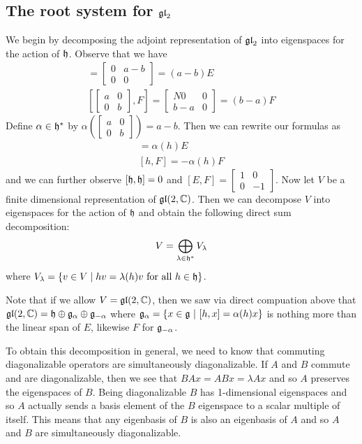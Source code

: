 \documentclass[12pt]{article}
\begin{document}
\subsection{The root system for $\mathfrak{gl}_2$}
We begin by decomposing the adjoint representation of $\mathfrak{gl}_2$ into eigenspaces for the action of $\mathfrak{h}$. Observe that we have \begin{align*}
    [\begin{bmatrix}
        a & 0 \\
        0 & b
    \end{bmatrix},E] = \begin{bmatrix}
        0 & a-b \\
        0 & 0
    \end{bmatrix} = (a-b)E \\
    [\begin{bmatrix}
        a & 0 \\
        0 & b
    \end{bmatrix},F] = \begin{bmatrix}N
        0 & 0 \\
        b-a & 0
    \end{bmatrix} = (b-a)F
\end{align*} Define $\alpha \in \mathfrak{h}^*$ by $\alpha(\begin{bmatrix}
    a & 0 \\
    0 & b
\end{bmatrix}) = a-b$. Then we can rewrite our formulas as \begin{align*}
    [h,E] = \alpha(h)E \\
    [h,F] = -\alpha(h)F
\end{align*} and we can further observe $[\mathfrak{h},\mathfrak{h}] = 0$ and $[E,F] = \begin{bmatrix}
    1 & 0 \\
    0 & -1
\end{bmatrix}$. Now let $V$ be a finite dimensional representation of $\mathfrak{gl}(2,\mathbb{C})$. 
Then we can decompose $V$ into eigenspaces for the action of $\mathfrak{h}$ and obtain the following 
direct sum decomposition: \begin{align*}
    V = \bigoplus_{\lambda\in \mathfrak{h}^*} V_\lambda
\end{align*} where $V_\lambda = \{v\in V \mid hv = \lambda(h)v \text{ for all } h\in \mathfrak{h}\}$.
\begin{remark}
    Note that if we allow $V = \operatorname{\mathfrak{gl}}(2,\mathbb{C})$, then we saw via direct compuation above that $\operatorname{\mathfrak{gl}}(2,\mathbb{C}) = \mathfrak{h} \oplus \mathfrak{g}_\alpha \oplus \mathfrak{g}_{-\alpha}$
    where $\mathfrak{g}_\alpha = \{x\in \mathfrak{g} \ \vert \  [h,x] = \alpha(h)x\}$ is nothing more than the linear span of $E$, likewise $F$ for $\mathfrak{g}_{-\alpha}$.
\end{remark}
To obtain this decomposition in general, we need to know that commuting diagonalizable operators are simultaneously diagonalizable. If $A$ and $B$ commute 
and are diagonalizable, then we see that $BAx = ABx = \lambda Ax$
and so $A$ preserves the eigenspaces of $B$. Being diagonalizable $B$ has 1-dimensional eigenspaces and
so $A$ actually sends a basis element of the $B$ eigenspace to a scalar multiple of itself. 
This means that any eigenbasis of $B$ is also an eigenbasis of $A$ and so $A$ and $B$ are simultaneously diagonalizable.
\end{document}
